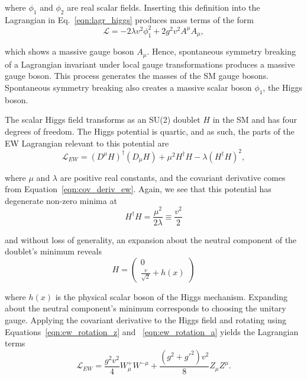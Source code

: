 \noindent where $\phi_1$ and $\phi_2$ are real scalar fields. Inserting this definition into the Lagrangian in Eq.~\ref{eqn:lagr_higgs} produces mass terms of the form
\begin{equation}
    \mathcal{L} = -2 \lambda v^2 \phi_1^2 + 2 g^2 v^2 A^\mu A_\mu,
\end{equation}

\noindent which shows a massive gauge boson $A_\mu$. Hence, spontaneous symmetry breaking of a Lagrangian invariant under local gauge transformations produces a massive gauge boson. This process generates the masses of the SM gauge bosons. Spontaneous symmetry breaking also creates a massive scalar boson $\phi_1$, the Higgs boson. 

The scalar Higgs field transforms as an SU(2) doublet $H$ in the SM and has four degrees of freedom. The Higgs potential is quartic, and as such, the parts of the EW Lagrangian relevant to this potential are
\begin{equation}
    \mathcal{L}_{EW} = (D^\mu H)^{\dagger}(D_\mu H) + \mu^2 H^\dagger H - \lambda(H^\dagger H)^2,
\end{equation}

\noindent where $\mu$ and $\lambda$ are positive real constants, and the covariant derivative comes from Equation~\ref{eqn:cov_deriv_ew}. Again, we see that this potential has degenerate non-zero minima at 
\begin{equation}
    H^\dagger H = \frac{\mu^2}{2\lambda} \equiv \frac{v^2}{2}
\end{equation}

\noindent and without loss of generality, an expansion about the neutral component of the doublet's minimum reveals
\begin{equation}
    H = \begin{pmatrix} 0 \\ \frac{v}{\sqrt{2}} + h(x) \end{pmatrix}
\end{equation}

\noindent where $h(x)$ is the physical scalar boson of the Higgs mechanism. Expanding about the neutral component's minimum corresponds to choosing the unitary gauge. Applying the covariant derivative to the Higgs field and rotating using Equations~\ref{eqn:ew_rotation_z} and ~\ref{eqn:ew_rotation_a} yields the Lagrangian terms
\begin{equation}
    \mathcal{L}_{EW} = \frac{g^2v^2}{4}W_\mu^+W^{- \mu} + \frac{(g^2 + g'^2)v^2}{8} Z_\mu Z^\mu.
\end{equation}

